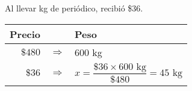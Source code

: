 Al llevar \fillin[$45$][0.8cm] kg de periódico, recibió \$36.

\begin{solutionbox}{2.1cm}\scriptsize
    \begin{tabular}{r>{\centering}p{0.2cm}l}
        \textbf{Precio} &               & \textbf{Peso}                                              \\
        \hline
        $\$480$       & $\Rightarrow$ & $600$ kg                                                     \\
        $\$36$        & $\Rightarrow$ & $x=\dfrac{\$36  \times 600 \text{ kg}}{\$480}=45 \text{ kg}$ \\
    \end{tabular}
\end{solutionbox}